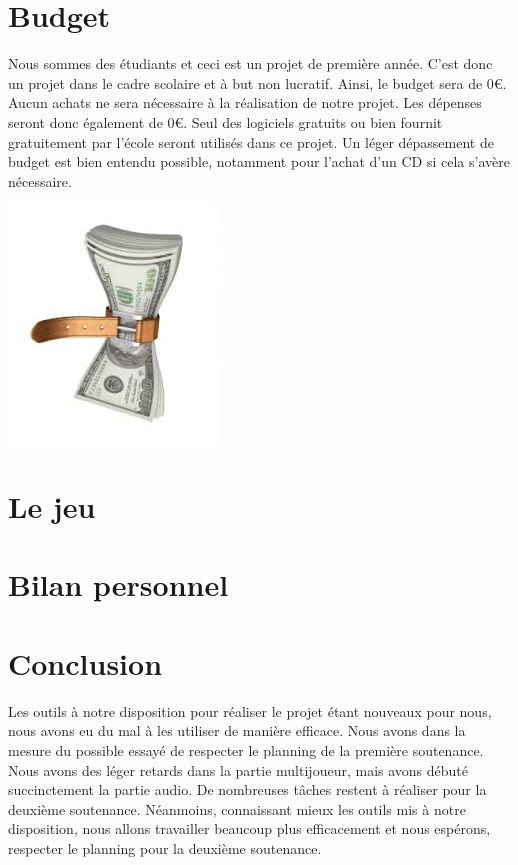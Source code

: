 \documentclass[a4paper, 12pt]{article}
\begin{document}
\section{Budget}

Nous sommes des étudiants et ceci est un projet de première année. C'est donc un projet dans le cadre scolaire et à but non lucratif. Ainsi, le budget sera de 0\euro{}. Aucun achats ne sera nécessaire à la réalisation de notre projet. Les dépenses seront donc également de 0\euro{}. Seul des logiciels gratuits ou bien fournit gratuitement par l'école seront utilisés dans ce projet. Un léger dépassement de budget est bien entendu possible, notamment pour l'achat d'un CD si cela s'avère nécessaire.\\
\centerline{\includegraphics[scale=0.7]{images.jpg}}
\section{Le jeu}
\section{Bilan personnel}

\section{Conclusion}

Les outils à notre disposition pour réaliser le projet étant  nouveaux pour nous, nous avons eu du mal à les utiliser de manière efficace. Nous avons dans la mesure du possible essayé de respecter le planning de la première soutenance. Nous avons des l\'eger retards dans la partie multijoueur, mais avons d\'ebut\'e succinctement la partie audio. De nombreuses tâches restent à réaliser pour la deuxième soutenance. Néanmoins, connaissant mieux les outils mis à notre disposition, nous allons travailler beaucoup plus efficacement et nous espérons, respecter le planning pour la deuxième soutenance. 
\end{document}

